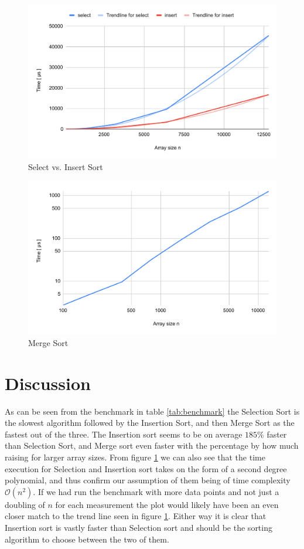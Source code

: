 \documentclass[a4paper,11pt]{article}
\begin{document}
\begin{figure}[h!]
    \centering
    \includegraphics[width=\textwidth]{Select and Insert Sort.pdf}
    \caption{Select vs. Insert Sort}
    \label{fig:selectInsert}
\end{figure}

\begin{figure}[h!]
    \centering
    \includegraphics[width=\textwidth]{Merge Sort.pdf}
    \caption{Merge Sort}
    \label{fig:merge}
\end{figure}
\section*{Discussion}
As can be seen from the benchmark in table \ref{tab:benchmark} the Selection Sort is the slowest algorithm followed by the Insertion Sort, and then Merge Sort as
the fastest out of the three. The Insertion sort seems to be on average $185\%$ faster than Selection Sort, and Merge sort even faster with the percentage by how 
much raising for larger array sizes. From figure \ref{fig:selectInsert} we can also see that the time execution for Selection and Insertion sort takes on the form 
of a second degree polynomial, and thus confirm our assumption of them being of time complexity $\mathcal{O}(n^2)$. If we had run the benchmark with more data 
points and not just a doubling of $n$ for each measurement the plot would likely have been an even closer match to the trend line seen in figure \ref{fig:selectInsert}.
Either way it is clear that Insertion sort is vastly faster than Selection sort and should be the sorting algorithm to choose between the two of them.
\end{document}
